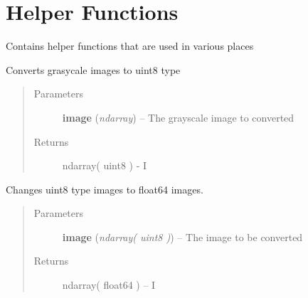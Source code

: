 \documentclass[letterpaper,10pt,english]{sphinxmanual}
\begin{document}
\section{Helper Functions}
\label{code:helper-functions}

\begin{fulllineitems}
\label{code:OratUtils.HFun}
Contains helper functions that are used in various places

\begin{fulllineitems}
\label{code:OratUtils.HFun.gray2uint8}
Converts grasycale images to uint8 type
\begin{quote}\begin{description}
\item[{Parameters}] \leavevmode
\textbf{image} (\emph{ndarray}) -- The grayscale image to converted

\item[{Returns}] \leavevmode
ndarray( uint8 ) - I

\end{description}\end{quote}

\end{fulllineitems}


\begin{fulllineitems}
\label{code:OratUtils.HFun.im2float}
Changes uint8 type images to float64 images.
\begin{quote}\begin{description}
\item[{Parameters}] \leavevmode
\textbf{image} (\emph{ndarray( uint8 )}) -- The image to be converted

\item[{Returns}] \leavevmode
ndarray( float64 ) -- I

\end{description}\end{quote}

\end{fulllineitems}


\end{fulllineitems}
\end{document}
